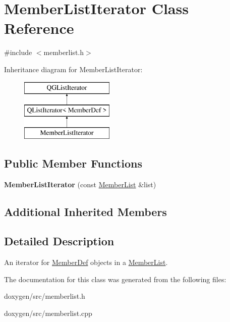 \hypertarget{class_member_list_iterator}{}\section{Member\+List\+Iterator Class Reference}
\label{class_member_list_iterator}


{\ttfamily \#include $<$memberlist.\+h$>$}

Inheritance diagram for Member\+List\+Iterator\+:\begin{figure}[H]
\begin{center}
\leavevmode
\includegraphics[height=3.000000cm]{class_member_list_iterator}
\end{center}
\end{figure}
\subsection*{Public Member Functions}
\begin{DoxyCompactItemize}
\item 
\mbox{\label{class_member_list_iterator_a9b54a94bd4f4c4d209efe1205ec9b315}} 
{\bfseries Member\+List\+Iterator} (const \mbox{\hyperlink{class_member_list}{Member\+List}} \&list)
\end{DoxyCompactItemize}
\subsection*{Additional Inherited Members}


\subsection{Detailed Description}
An iterator for \mbox{\hyperlink{class_member_def}{Member\+Def}} objects in a \mbox{\hyperlink{class_member_list}{Member\+List}}. 

The documentation for this class was generated from the following files\+:\begin{DoxyCompactItemize}
\item 
doxygen/src/memberlist.\+h\item 
doxygen/src/memberlist.\+cpp\end{DoxyCompactItemize}

